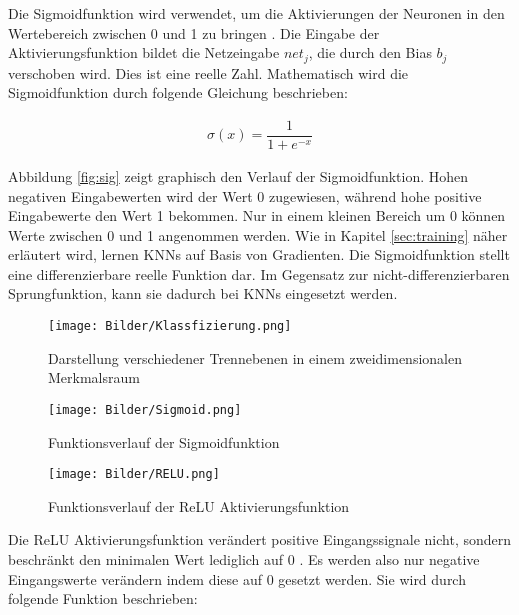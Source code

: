 Die Sigmoidfunktion wird verwendet, um die Aktivierungen der Neuronen in den Wertebereich zwischen 0 und 1 zu bringen \cite{Li2020a}. 
Die Eingabe der Aktivierungsfunktion bildet die Netzeingabe $ net_j $, die durch den Bias $ b_j $ verschoben wird. Dies ist eine reelle Zahl. Mathematisch wird die Sigmoidfunktion durch folgende Glei\-chung beschrieben: 

\begin{align}
	\sigma(x) = \dfrac{1}{1+e^{-x}}
\end{align}

Abbildung \ref{fig:sig} zeigt graphisch den Verlauf der Sigmoidfunktion. Hohen negativen Eingabewerten wird der Wert 0 zugewiesen, während hohe positive Eingabewerte den Wert 1 bekommen. Nur in einem kleinen Bereich um 0 können Werte zwischen 0 und 1 angenommen werden. Wie in Kapitel \ref{sec:training} näher erläutert wird, lernen KNNs auf Basis von Gradienten. Die Sigmoidfunktion stellt eine differenzierbare reelle Funktion dar. Im Gegensatz zur nicht-differenzierbaren Sprungfunktion, kann sie dadurch bei KNNs eingesetzt werden.


\begin{figure}
	\centering
	\begin {minipage}[t]{0.3\linewidth}
		\centering
		\texttt{[image: Bilder/Klassfizierung.png]}
		\caption{Darstellung verschiedener Trennebenen in einem zweidimensionalen Merkmalsraum}
		\label{fig:trennebene}
	\end{minipage} 
	\hfill
	\begin{minipage}[t]{0.3\linewidth}
		\centering
		\texttt{[image: Bilder/Sigmoid.png]}
		\caption{Funktionsverlauf der Sigmoidfunktion}
		\label{fig:sig}
	\end{minipage}
	\hfill
	\begin{minipage}[t]{0.3\linewidth}
		\centering
		\texttt{[image: Bilder/RELU.png]}
		\caption{Funktionsverlauf der ReLU Aktivierungsfunktion}
		\label{fig:relu}
	\end{minipage}
\end{figure}

Die ReLU Aktivierungsfunktion verändert positive Eingangssignale nicht, sondern beschränkt den minimalen Wert lediglich auf 0 \cite{Li2020a}. 
Es werden also nur negative Eingangswerte verändern indem diese auf 0 gesetzt werden. Sie wird durch folgende Funktion beschrieben: 

